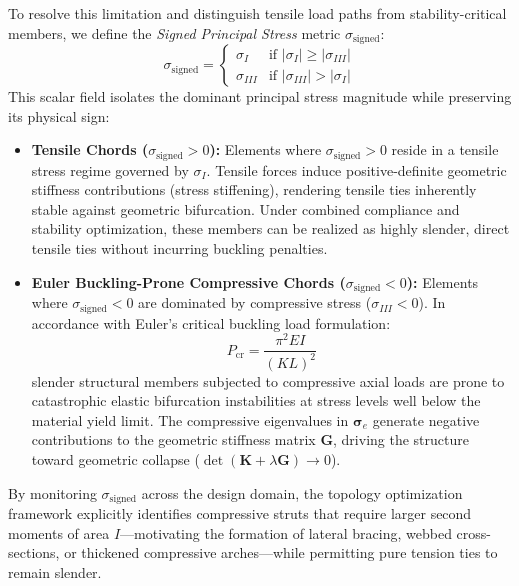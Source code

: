 \documentclass[11pt, a4paper]{article}
\begin{document}
To resolve this limitation and distinguish tensile load paths from stability-critical members, we define the \textit{Signed Principal Stress} metric $\sigma_{\text{signed}}$:
\begin{equation}
\sigma_{\text{signed}} = \begin{cases} 
\sigma_I & \text{if } |\sigma_I| \ge |\sigma_{III}| \\[6pt]
\sigma_{III} & \text{if } |\sigma_{III}| > |\sigma_I| 
\end{cases}
\end{equation}
This scalar field isolates the dominant principal stress magnitude while preserving its physical sign:
\begin{itemize}
    \item \textbf{Tensile Chords ($\sigma_{\text{signed}} > 0$):} Elements where $\sigma_{\text{signed}} > 0$ reside in a tensile stress regime governed by $\sigma_I$. Tensile forces induce positive-definite geometric stiffness contributions (stress stiffening), rendering tensile ties inherently stable against geometric bifurcation. Under combined compliance and stability optimization, these members can be realized as highly slender, direct tensile ties without incurring buckling penalties.
    \item \textbf{Euler Buckling-Prone Compressive Chords ($\sigma_{\text{signed}} < 0$):} Elements where $\sigma_{\text{signed}} < 0$ are dominated by compressive stress ($\sigma_{III} < 0$). In accordance with Euler's critical buckling load formulation:
    \begin{equation}
    P_{\text{cr}} = \frac{\pi^2 E I}{(K L)^2}
    \end{equation}
    slender structural members subjected to compressive axial loads are prone to catastrophic elastic bifurcation instabilities at stress levels well below the material yield limit. The compressive eigenvalues in $\boldsymbol{\sigma}_e$ generate negative contributions to the geometric stiffness matrix $\mathbf{G}$, driving the structure toward geometric collapse ($\det(\mathbf{K} + \lambda \mathbf{G}) \to 0$).
\end{itemize}
By monitoring $\sigma_{\text{signed}}$ across the design domain, the topology optimization framework explicitly identifies compressive struts that require larger second moments of area $I$—motivating the formation of lateral bracing, webbed cross-sections, or thickened compressive arches—while permitting pure tension ties to remain slender.
\end{document}
